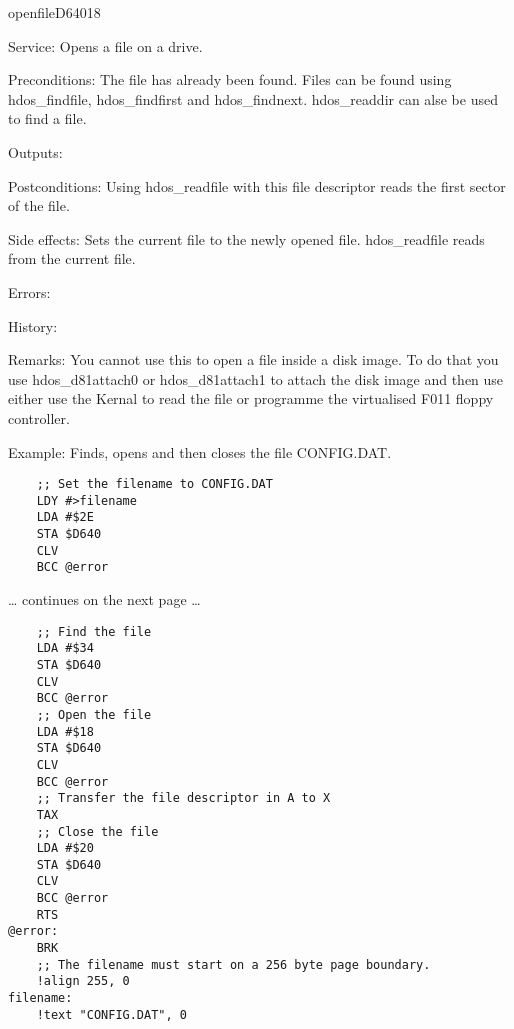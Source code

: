 \newpage
\begin{hyppotrap}{openfile}{D640}{18}
\item [Service:]
  Opens a file on a drive.
\item [Preconditions:]
  The file has already been found. Files can be found using hdos\_findfile,
  hdos\_findfirst and hdos\_findnext. hdos\_readdir can alse be used to find a
  file.
\item [Outputs:]
\item [Postconditions:]
  Using hdos\_readfile with this file descriptor reads the first sector of the
  file.
\item [Side effects:]
  Sets the current file to the newly opened file. hdos\_readfile reads from the
  current file.
\item [Errors:]
\item [History:]
\item [Remarks:]
  You cannot use this to open a file inside a disk image. To do that you use
  hdos\_d81attach0 or hdos\_d81attach1 to attach the disk image and then use
  either use the Kernal to read the file or programme the virtualised F011 floppy
  controller.
\item [Example:]
  Finds, opens and then closes the file CONFIG.DAT.

\begin{tcolorbox}[colback=black,coltext=white]
\verbatimfont{\codefont}
\begin{verbatim}
    ;; Set the filename to CONFIG.DAT
    LDY #>filename
    LDA #$2E
    STA $D640
    CLV
    BCC @error
\end{verbatim}
\end{tcolorbox}

\ldots{} continues on the next page \ldots

\begin{tcolorbox}[colback=black,coltext=white]
\verbatimfont{\codefont}
\begin{verbatim}
    ;; Find the file
    LDA #$34
    STA $D640
    CLV
    BCC @error
    ;; Open the file
    LDA #$18
    STA $D640
    CLV
    BCC @error
    ;; Transfer the file descriptor in A to X
    TAX
    ;; Close the file
    LDA #$20
    STA $D640
    CLV
    BCC @error
    RTS
@error:
    BRK
    ;; The filename must start on a 256 byte page boundary.
    !align 255, 0
filename:
    !text "CONFIG.DAT", 0
\end{verbatim}
\end{tcolorbox}
\end{hyppotrap}



